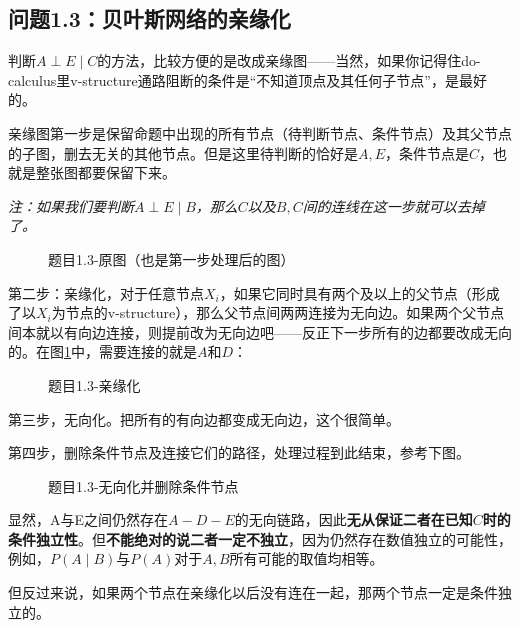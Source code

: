 \documentclass[12pt]{article}
\begin{document}
\subsection{问题1.3：贝叶斯网络的亲缘化}
判断$A \perp E \mid C$的方法，比较方便的是改成亲缘图——当然，如果你记得住do-calculus里v-structure通路阻断的条件是“不知道顶点及其任何子节点”，是最好的。

亲缘图第一步是保留命题中出现的所有节点（待判断节点、条件节点）及其父节点的子图，删去无关的其他节点。但是这里待判断的恰好是$A,E$，条件节点是$C$，也就是整张图都要保留下来。

\textit{注：如果我们要判断$A \perp E \mid B$，那么$C$以及$B,C$间的连线在这一步就可以去掉了。}
\begin{figure}[h]
	\centering
	\caption{题目1.3-原图（也是第一步处理后的图）}
	\label{fig:bayesnet-origin}
\end{figure}

第二步：亲缘化，对于任意节点$X_i$，如果它同时具有两个及以上的父节点（形成了以$X_i$为节点的v-structure），那么父节点间两两连接为无向边。如果两个父节点间本就以有向边连接，则提前改为无向边吧——反正下一步所有的边都要改成无向的。在图\ref{fig:bayesnet-origin}中，需要连接的就是$A$和$D$：

\begin{figure}[h]
	\centering
	\caption{题目1.3-亲缘化}
	\label{fig:bayesnet-moralized}
\end{figure}

第三步，无向化。把所有的有向边都变成无向边，这个很简单。

第四步，删除条件节点及连接它们的路径，处理过程到此结束，参考下图。

\begin{figure}[h]
	\centering
	\caption{题目1.3-无向化并删除条件节点}
	\label{fig:bayesnet-deoriented_delete_given}
\end{figure}

显然，A与E之间仍然存在$A - D - E$的无向链路，因此\textbf{无从保证二者在已知$C$时的条件独立性}。但\textbf{不能绝对的说二者一定不独立}，因为仍然存在数值独立的可能性，例如，$P(A\mid B)$与$P(A)$对于$A,B$所有可能的取值均相等。

但反过来说，如果两个节点在亲缘化以后没有连在一起，那两个节点一定是条件独立的。
\end{document}
